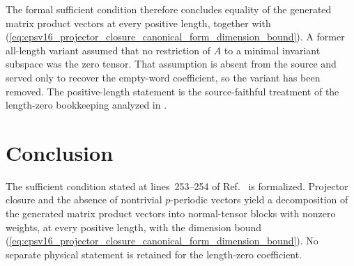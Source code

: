 \documentclass{article}
\begin{document}
The formal sufficient condition therefore concludes equality of the generated
matrix product vectors at every positive length, together with
(\ref{eq:cpsv16_projector_closure_canonical_form_dimension_bound}). A former
all-length variant assumed that no restriction of $A$ to a minimal invariant
subspace was the zero tensor. That assumption is absent from the source and
served only to recover the empty-word coefficient, so the variant has been
removed. The positive-length statement is the source-faithful treatment of
the length-zero bookkeeping analyzed in
.

\section{Conclusion}

The sufficient condition stated at lines~253--254 of
Ref.~\cite{Cirac2016MPDO_arXiv} is formalized. Projector closure and the
absence of nontrivial $p$-periodic vectors yield a decomposition of the
generated matrix product vectors into normal-tensor blocks with nonzero
weights, at every positive length, with the dimension bound
(\ref{eq:cpsv16_projector_closure_canonical_form_dimension_bound}). No separate
physical statement is retained for the length-zero coefficient.



\end{document}
